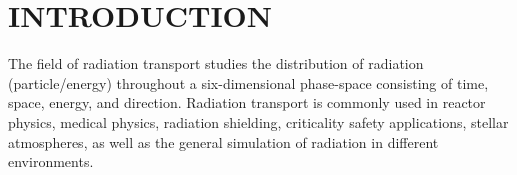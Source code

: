 %
%
%
%



\pagestyle{plain} %
\setcounter{page}{1}


\chapter{\uppercase {INTRODUCTION}}\label{cha:introduction}

The field of radiation transport studies the distribution of radiation (particle/energy) throughout a six-dimensional phase-space consisting of time, space, energy, and direction. 
Radiation transport is commonly used in reactor physics, medical physics, radiation shielding, criticality safety applications, stellar atmospheres, as well as the general simulation of radiation in different environments. 


